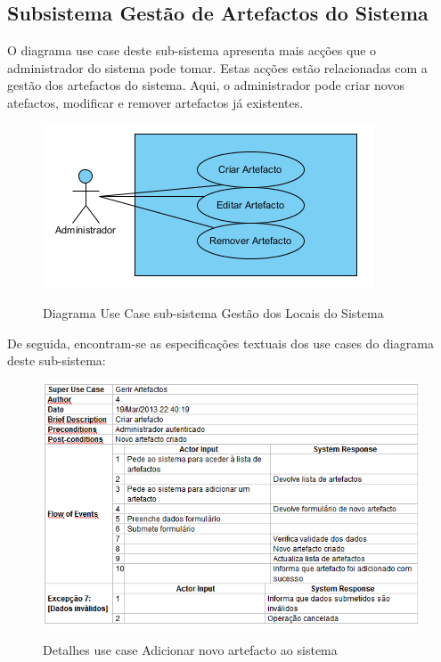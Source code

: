 ﻿\documentclass[12pt,a4paper]{article}
\begin{document}
\clearpage

\subsection{Subsistema Gestão de Artefactos do Sistema}

O diagrama use case deste sub-sistema apresenta mais acções que o administrador do sistema
pode tomar. Estas acções estão relacionadas com a gestão dos artefactos do sistema. Aqui, o
administrador pode criar novos atefactos, modificar e remover artefactos já existentes.\\

\begin{figure}[h!]
\centering
\includegraphics[scale=1]{usecase/A_GerarArtefactos}
\label{usecase}
\caption{Diagrama Use Case sub-sistema Gestão dos Locais do Sistema}
\end{figure}

De seguida, encontram-se as especificações textuais dos use cases do diagrama deste sub-sistema:\\

\begin{figure}[h!]
\centering
\includegraphics[scale=0.7]{d_usecase/A_criarartefacto}
\label{usecase}
\caption{Detalhes use case Adicionar novo artefacto ao sistema}
\end{figure}
\end{document}
